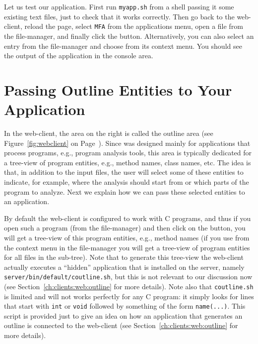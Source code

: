 Let us test our application. First run \texttt{myapp.sh} from a shell
passing it some existing text files, just to check that it works
correctly.
%
Then go back to the web-client, reload the page, select \texttt{MFA}
from the applications menu, open a file from the file-manager, and
finally click the \applybutton button. Alternatively, you can also
select an entry from the file-manager and choose \applybutton from its
context menu. You should see the output of the application in the
console area.

\section{Passing Outline Entities to Your Application}
\label{ch:quickguide:outline}

In the web-client, the area on the right is called the outline area
(see Figure~\ref{fig:webclient} on Page~\pageref{fig:webclient}).
%
Since \ei was designed mainly for applications that process programs,
e.g., program analysis tools, this area is typically dedicated for a
tree-view of program entities, e.g., method names, class names, etc.
%
The idea is that, in addition to the input files, the user will select
some of these entities to indicate, for example, where the analysis
should start from or which parts of the program to analyze.
%
Next we explain how we can pass these selected entities to an
application.

By default the web-client is configured to work with C programs, and
thus if you open such a program (from the file-manager) and then click
on the  button, you will get a tree-view of this
program entities, e.g., method names (if you use  from
the context menu in the file-manager you will get a tree-view of
program entities for all files in the sub-tree).
%
Note that to generate this tree-view the web-client actually executes
a ``hidden'' application that is installed on the server, namely
\texttt{server/bin/default/coutline.sh}, but this is not relevant to
our discussion now (see Section~\ref{ch:clients:web:outline} for more
details).
%
Note also
that \texttt{coutline.sh} is limited and will not works perfectly for
any C program: it simply looks for lines that start with \texttt{int}
or \texttt{void} followed by something of the form
\texttt{name(...)}. 
%
This script is provided just to give an idea on how an application
that generates an outline is connected to the web-client (see
Section~\ref{ch:clients:web:outline} for more details).

